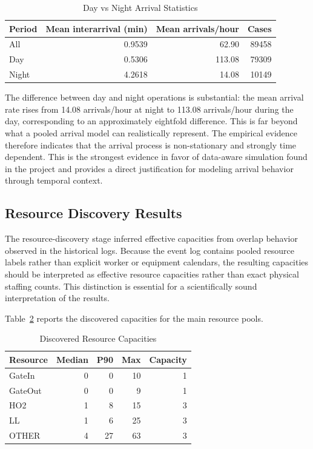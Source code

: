 \begin{table}[h!]
\centering
\caption{Day vs Night Arrival Statistics}
\label{tab:arrival_day_night}
\begin{tabular}{lrrr}
\toprule
Period & Mean interarrival (min) & Mean arrivals/hour & Cases \\
\midrule
All & 0.9539 & 62.90 & 89458 \\
Day & 0.5306 & 113.08 & 79309 \\
Night & 4.2618 & 14.08 & 10149 \\
\bottomrule
\end{tabular}
\end{table}

The difference between day and night operations is substantial: the mean arrival rate rises from 14.08 arrivals/hour at night to 113.08 arrivals/hour during the day, corresponding to an approximately eightfold difference. This is far beyond what a pooled arrival model can realistically represent. The empirical evidence therefore indicates that the arrival process is non-stationary and strongly time dependent. This is the strongest evidence in favor of data-aware simulation found in the project and provides a direct justification for modeling arrival behavior through temporal context.

\subsection{Resource Discovery Results}
\label{sec:resource_discovery_results}

The resource-discovery stage inferred effective capacities from overlap behavior observed in the historical logs. Because the event log contains pooled resource labels rather than explicit worker or equipment calendars, the resulting capacities should be interpreted as effective resource capacities rather than exact physical staffing counts. This distinction is essential for a scientifically sound interpretation of the results.

Table~\ref{tab:resource_capacities} reports the discovered capacities for the main resource pools.

\begin{table}[h!]
\centering
\caption{Discovered Resource Capacities}
\label{tab:resource_capacities}
\begin{tabular}{lrrrr}
\toprule
Resource & Median & P90 & Max & Capacity \\
\midrule
GateIn & 0 & 0 & 10 & 1 \\
GateOut & 0 & 0 & 9 & 1 \\
HO2 & 1 & 8 & 15 & 3 \\
LL & 1 & 6 & 25 & 3 \\
OTHER & 4 & 27 & 63 & 3 \\
\bottomrule
\end{tabular}
\end{table}


